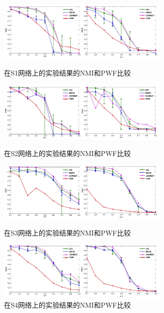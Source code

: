 \begin{figure}
  \centering
  \includegraphics[width=0.75\textwidth]{figures/S1deNMIhePWF}
  \caption{在S1网络上的实验结果的NMI和PWF比较}\label{fig:S1deNMIhePWF}

  \includegraphics[width=0.75\textwidth]{figures/S2deNMIhePWF}
  \caption{在S2网络上的实验结果的NMI和PWF比较}\label{fig:S2deNMIhePWF}

  \includegraphics[width=0.75\textwidth]{figures/S3deNMIhePWF}
  \caption{在S3网络上的实验结果的NMI和PWF比较}\label{fig:S3deNMIhePWF}

  \includegraphics[width=0.75\textwidth]{figures/S4deNMIhePWF}
  \caption{在S4网络上的实验结果的NMI和PWF比较}\label{fig:S4deNMIhePWF}
\end{figure}

